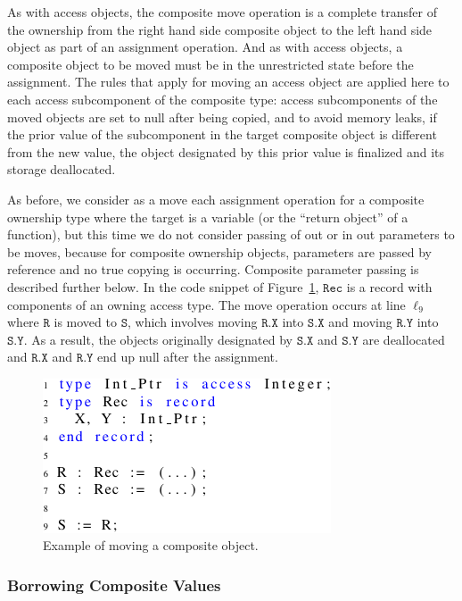 \documentclass[runningheads]{llncs}
\newcommand\var[1]{\ensuremath{\mathtt{#1}}}
\newcommand{\keyword}[1]{\textsf{#1}}
\begin{document}
As with access objects, the composite move operation is a complete transfer of the ownership from the right hand side composite object to the left hand
side object as part of an assignment operation. And as with access objects, a composite object to be moved must be in the unrestricted state before the assignment. The rules that apply for moving an
access object are applied here to each access subcomponent of the composite type: access subcomponents of the moved objects are set to null after being copied, and to avoid memory leaks, if the
prior value of the subcomponent in the target composite object is different from the new value, the object designated by this prior value is finalized and its storage deallocated.

As before, we consider as a move each assignment operation for a composite ownership type where the target is a variable (or the ``return object'' of a function), but this time we do not
consider passing of \keyword{out} or \keyword{in out} parameters to be moves, because for composite ownership objects, parameters are passed by reference and no true copying is occurring. Composite parameter passing is described further below.
In the code snippet of Figure~\ref{fig:movingComposite}, \var{Rec} is a record with components of an owning access type. The move operation occurs at line $\ell_{9}$ where \var{R} is moved
to \var{S}, which involves moving \var{R.X} into \var{S.X} and moving \var{R.Y} into \var{S.Y}. As a result, the objects originally designated by
\var{S.X} and \var{S.Y} are deallocated and \var{R.X} and \var{R.Y} end up null after the assignment.


\begin{figure}[htb!]
\centering
   \includegraphics[]{movingComposite}
   \caption{Example of moving a composite object.}
   \label{fig:movingComposite}
\end{figure}

\subsubsection{Borrowing Composite Values}
\label{subsubsec:borrowComposite}
\end{document}
